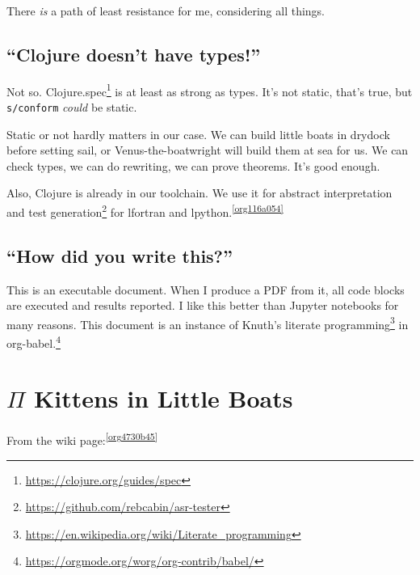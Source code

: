 \documentclass[10pt,oneside,x11names]{article}
\theoremstyle{definition}
\theoremstyle{warning}
\begin{document}
There \emph{is} a path of least resistance for me, considering all
things.

\subsection{``Clojure doesn't have types!''}
\label{sec:org725c528}

Not so. Clojure.spec\footnote{\url{https://clojure.org/guides/spec}} is at
least as strong as types. It's not static, that's true, but
\texttt{s/conform} \emph{could} be static.

Static or not hardly matters in our case. We can build little
boats in drydock before setting sail, or Venus-the-boatwright will
build them at sea for us. We can check types, we can do rewriting,
we can prove theorems. It's good enough.

Also, Clojure is already in our toolchain. We use it for abstract
interpretation and test generation\footnote{\url{https://github.com/rebcabin/asr-tester}}
for lfortran and lpython.\textsuperscript{\ref{org116a054}}

\subsection{``How did you write this?''}
\label{sec:orgc2d7d62}

This is an executable document. When I produce a PDF from it, all
code blocks are executed and results reported. I like this better
than Jupyter notebooks for many reasons. This document
is an instance of Knuth's literate programming\footnote{\url{https://en.wikipedia.org/wiki/Literate\_programming}} in
org-babel.\footnote{\url{https://orgmode.org/worg/org-contrib/babel/}}

\newpage
\section{\(\Pi\) Kittens in Little Boats}
\label{sec:org72375eb}

From the wiki page:\textsuperscript{\ref{org4730b45}}
\end{document}
